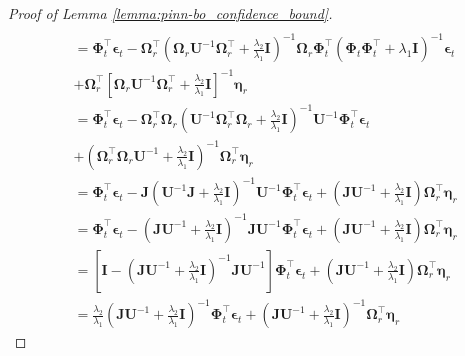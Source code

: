 \begin{proof}[Proof of Lemma \ref{lemma:pinn-bo_confidence_bound}]
\begin{align*}
\\
       &=\boldsymbol{\Phi}_t^\top \boldsymbol{\epsilon}_t - \boldsymbol{\Omega}_r^\top \left(\boldsymbol{\Omega}_r\mathbf{U}^{-1} \boldsymbol{\Omega}_r^\top + \frac{\lambda_2}{\lambda_1}\mathbf{I}\right)^{-1} \boldsymbol{\Omega}_r \boldsymbol{\Phi}_t^\top (\boldsymbol{\Phi}_t\boldsymbol{\Phi}_t^\top + \lambda_1\mathbf{I})^{-1}\boldsymbol{\epsilon}_t  
\\
       & + \boldsymbol{\Omega}_r^\top\left[\boldsymbol{\Omega}_r\mathbf{U}^{-1} \boldsymbol{\Omega}_r^\top + \frac{\lambda_2}{\lambda_1}\mathbf{I}\right]^{-1}\boldsymbol{\eta}_r 
\\
       & = \boldsymbol{\Phi}_t^\top \boldsymbol{\epsilon}_t - \boldsymbol{\Omega}_r^\top \boldsymbol{\Omega}_r \left(\mathbf{U}^{-1}\boldsymbol{\Omega}_r^\top \boldsymbol{\Omega}_r + \frac{\lambda_2}{\lambda_1}\mathbf{I} \right)^{-1} \mathbf{U}^{-1} \boldsymbol{\Phi}_t^\top \boldsymbol{\epsilon}_t 
\\
       & + \left(\boldsymbol{\Omega}_r^\top \boldsymbol{\Omega}_r\mathbf{U}^{-1} +  \frac{\lambda_2}{\lambda_1}\mathbf{I}\right) ^{-1} \boldsymbol{\Omega}_r^\top \boldsymbol{\eta}_r  
\\
       & = \boldsymbol{\Phi}_t^\top \boldsymbol{\epsilon}_t - \mathbf{J} \left(\mathbf{U}^{-1} \mathbf{J} + \frac{\lambda_2}{\lambda_1}\mathbf{I} \right)^{-1} \mathbf{U}^{-1} \boldsymbol{\Phi}_t^\top \boldsymbol{\epsilon}_t + \left(\mathbf{J} \mathbf{U}^{-1} + \frac{\lambda_2}{\lambda_1}\mathbf{I}\right) \boldsymbol{\Omega}_r^\top \boldsymbol{\eta}_r 
\\
       & = \boldsymbol{\Phi}_t^\top \boldsymbol{\epsilon}_t -  \left(\mathbf{J}\mathbf{U}^{-1}  + \frac{\lambda_2}{\lambda_1}\mathbf{I} \right)^{-1} \mathbf{J}\mathbf{U}^{-1} \boldsymbol{\Phi}_t^\top \boldsymbol{\epsilon}_t + \left(\mathbf{J} \mathbf{U}^{-1} + \frac{\lambda_2}{\lambda_1}\mathbf{I}\right) \boldsymbol{\Omega}_r^\top \boldsymbol{\eta}_r 
\\ 
       & = \left[ \mathbf{I} -\left(\mathbf{J}\mathbf{U}^{-1}  + \frac{\lambda_2}{\lambda_1}\mathbf{I} \right)^{-1} \mathbf{J}\mathbf{U}^{-1} \right] \boldsymbol{\Phi}_t^\top \boldsymbol{\epsilon}_t + \left(\mathbf{J} \mathbf{U}^{-1} + \frac{\lambda_2}{\lambda_1}\mathbf{I}\right) \boldsymbol{\Omega}_r^\top \boldsymbol{\eta}_r 
\\
       & = \frac{\lambda_2}{\lambda_1} \left(\mathbf{J}\mathbf{U}^{-1}  + \frac{\lambda_2}{\lambda_1}\mathbf{I} \right)^{-1}\boldsymbol{\Phi}_t^\top \boldsymbol{\epsilon}_t +  \left(\mathbf{J}\mathbf{U}^{-1}  + \frac{\lambda_2}{\lambda_1}\mathbf{I} \right)^{-1}\boldsymbol{\Omega}_r^\top \boldsymbol{\eta}_r 

\end{align*}
\end{proof}
